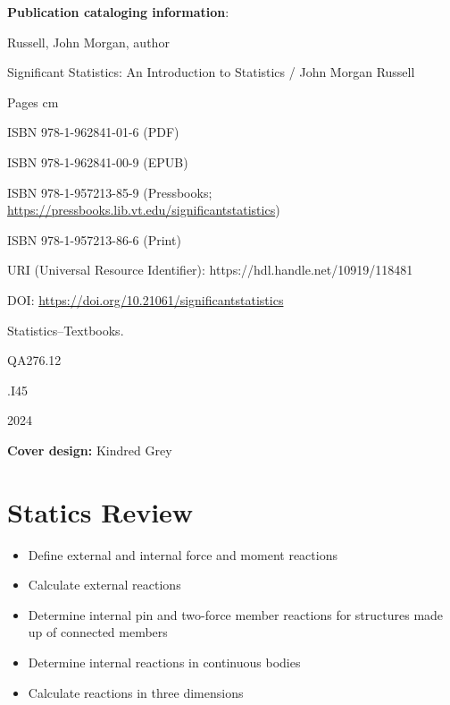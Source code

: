 \documentclass[
  letterpaper,
  DIV=11,
  numbers=noendperiod]{scrreprt}
\providecommand{\tightlist}{%
  \setlength{\itemsep}{0pt}\setlength{\parskip}{0pt}}\usepackage{longtable,booktabs,array}
\theoremstyle{definition}
\theoremstyle{remark}
\begin{document}
\textbf{Publication cataloging information}:

Russell, John Morgan, author

Significant Statistics: An Introduction to Statistics / John Morgan
Russell

Pages cm

ISBN 978-1-962841-01-6 (PDF)

ISBN 978-1-962841-00-9 (EPUB)

ISBN 978-1-957213-85-9 (Pressbooks;
\url{https://pressbooks.lib.vt.edu/significantstatistics})

ISBN 978-1-957213-86-6 (Print)

URI (Universal Resource Identifier): https://hdl.handle.net/10919/118481

DOI: \url{https://doi.org/10.21061/significantstatistics}

Statistics--Textbooks.

QA276.12

.I45

2024

\textbf{Cover design:} Kindred Grey


\chapter{Statics Review}\label{sec-statics}

\begin{tcolorbox}[enhanced jigsaw, leftrule=.75mm, colbacktitle=quarto-callout-note-color!10!white, breakable, opacityback=0, colback=white, titlerule=0mm, toprule=.15mm, colframe=quarto-callout-note-color-frame, coltitle=black, title={Learning Objectives}, toptitle=1mm, bottomrule=.15mm, rightrule=.15mm, left=2mm, arc=.35mm, opacitybacktitle=0.6, bottomtitle=1mm]

\begin{itemize}
\tightlist
\item
  Define external and internal force and moment reactions
\item
  Calculate external reactions
\item
  Determine internal pin and two-force member reactions for structures
  made up of connected members
\item
  Determine internal reactions in continuous bodies
\item
  Calculate reactions in three dimensions
\end{itemize}

\end{tcolorbox}
\end{document}
